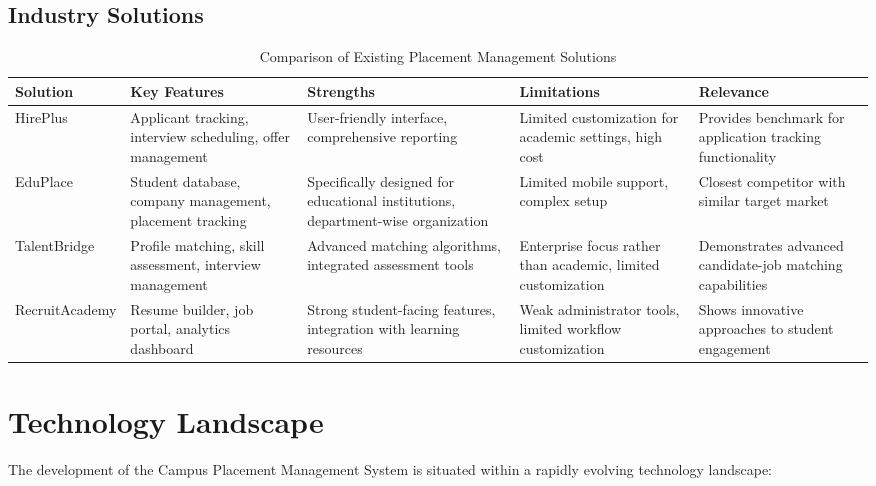 \documentclass[12pt,a4paper]{report}
\begin{document}
\subsection{Industry Solutions}
\begin{table}[H]
    \centering
    \caption{Comparison of Existing Placement Management Solutions}
    \label{tab:existing-solutions}
    \begin{tabularx}{\textwidth}{|X|X|X|X|X|}
        \hline
        \textbf{Solution} & \textbf{Key Features} & \textbf{Strengths} & \textbf{Limitations} & \textbf{Relevance} \\
        \hline
        HirePlus & Applicant tracking, interview scheduling, offer management & User-friendly interface, comprehensive reporting & Limited customization for academic settings, high cost & Provides benchmark for application tracking functionality \\
        \hline
        EduPlace & Student database, company management, placement tracking & Specifically designed for educational institutions, department-wise organization & Limited mobile support, complex setup & Closest competitor with similar target market \\
        \hline
        TalentBridge & Profile matching, skill assessment, interview management & Advanced matching algorithms, integrated assessment tools & Enterprise focus rather than academic, limited customization & Demonstrates advanced candidate-job matching capabilities \\
        \hline
        RecruitAcademy & Resume builder, job portal, analytics dashboard & Strong student-facing features, integration with learning resources & Weak administrator tools, limited workflow customization & Shows innovative approaches to student engagement \\
        \hline
    \end{tabularx}
\end{table}

\section{Technology Landscape}
The development of the Campus Placement Management System is situated within a rapidly evolving technology landscape:
\end{document}
